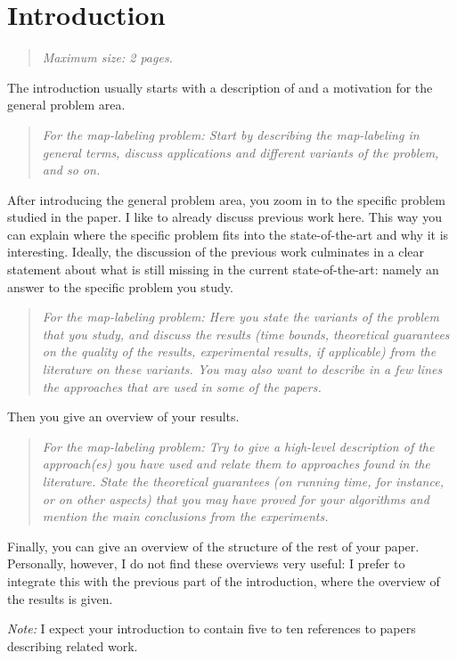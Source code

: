 \documentclass[11pt]{article}
\newcommand{\maxsize}[1]{\begin{quotation} {\sl \noindent Maximum size: #1.} \end{quotation}}
\newcommand{\ml}[1]{\begin{quotation} {\sl \noindent For the map-labeling problem: #1} \end{quotation}}
\begin{document}
\section{Introduction}
\label{se:introduction}
\maxsize{2 pages}
The introduction usually starts with a description of and
a motivation for the general problem area.
%
\ml{Start by describing the map-labeling in general terms, discuss applications and
different variants of the problem, and so on.}
%
After introducing the general problem area, you zoom in to the specific problem
studied in the paper. I like to already discuss previous work here. This way
you can explain where the specific problem fits into the state-of-the-art
and why it is interesting. Ideally, the discussion of the previous work
culminates in a clear statement about what is still missing in the current
state-of-the-art: namely an answer to the specific problem you study.
%
\ml{Here you state the variants of the problem that you study, and discuss the results
(time bounds, theoretical guarantees on the quality of the results, experimental results,
if applicable) from the literature on these variants. You may also want to describe
in a few lines the approaches that are used in some of the papers.}
%
Then you give an overview of your results.
%
\ml{Try to give a high-level description of the
approach(es) you have used and relate them to approaches found in the literature.
State the theoretical guarantees (on running time,
for instance, or on other aspects) that you may have proved for your algorithms
and mention the main conclusions from the experiments.}
%
Finally, you can give an overview of the structure of the rest of your paper.
Personally, however, I do not find these overviews very useful: I prefer to
integrate this with the previous part of the introduction, where the overview
of the results is given.
\medskip

\emph{Note:} I expect your introduction to
contain five to ten references to papers describing related work.
\end{document}
